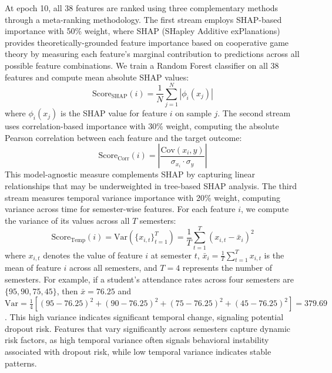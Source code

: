 \documentclass[journal]{IEEEtran}
\begin{document}
At epoch 10, all 38 features are ranked using three complementary methods through a meta-ranking methodology. The first stream employs SHAP-based importance with 50\% weight, where SHAP (SHapley Additive exPlanations) provides theoretically-grounded feature importance based on cooperative game theory by measuring each feature's marginal contribution to predictions across all possible feature combinations. We train a Random Forest classifier on all 38 features and compute mean absolute SHAP values:
\begin{equation}
\text{Score}_{\text{SHAP}}(i) = \frac{1}{N} \sum_{j=1}^{N} |\phi_i(x_j)|
\end{equation}
where $\phi_i(x_j)$ is the SHAP value for feature $i$ on sample $j$. The second stream uses correlation-based importance with 30\% weight, computing the absolute Pearson correlation between each feature and the target outcome:
\begin{equation}
\text{Score}_{\text{Corr}}(i) = \left| \frac{\text{Cov}(x_i, y)}{\sigma_{x_i} \cdot \sigma_y} \right|
\end{equation}
This model-agnostic measure complements SHAP by capturing linear relationships that may be underweighted in tree-based SHAP analysis. The third stream measures temporal variance importance with 20\% weight, computing variance across time for semester-wise features. For each feature $i$, we compute the variance of its values across all $T$ semesters:
\begin{equation}
\text{Score}_{\text{Temp}}(i) = \text{Var}(\{x_{i,t}\}_{t=1}^{T}) = \frac{1}{T}\sum_{t=1}^{T}(x_{i,t} - \bar{x}_i)^2
\end{equation}
where $x_{i,t}$ denotes the value of feature $i$ at semester $t$, $\bar{x}_i = \frac{1}{T}\sum_{t=1}^{T}x_{i,t}$ is the mean of feature $i$ across all semesters, and $T=4$ represents the number of semesters. For example, if a student's attendance rates across four semesters are $\{95, 90, 75, 45\}$, then $\bar{x} = 76.25$ and $\text{Var} = \frac{1}{4}[(95-76.25)^2 + (90-76.25)^2 + (75-76.25)^2 + (45-76.25)^2] = 379.69$. This high variance indicates significant temporal change, signaling potential dropout risk. Features that vary significantly across semesters capture dynamic risk factors, as high temporal variance often signals behavioral instability associated with dropout risk, while low temporal variance indicates stable patterns.
\end{document}

